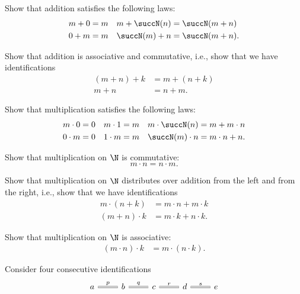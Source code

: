 \begin{exercises}
  \begin{subexenum}
  \item Show that addition satisfies the following laws:
    \begin{align*}
      m+0 & = m & m+\succN(n) & = \succN(m+n) \\
      0+m & = m & \succN(m)+n & = \succN(m+n).
    \end{align*}
  \item Show that addition is associative and commutative, i.e., show that we have identifications
    \begin{align*}
      (m+n)+k & = m+(n+k) \\
      m+n & = n+m.
    \end{align*}
  \item Show that multiplication satisfies the following laws:
    \begin{align*}
      m\cdot 0 & = 0 & m\cdot 1 & = m & m\cdot \succN(n) & = m+m\cdot n \\
      0\cdot m & = 0 & 1\cdot m & = m & \succN(m)\cdot n & = m\cdot n+n.
    \end{align*}
  \item Show that multiplication on $\N$ is commutative:
    \begin{equation*}
      m\cdot n=n\cdot m.
    \end{equation*}
  \item Show that multiplication on $\N$ distributes over addition from the left and from the right, i.e., show that we have identifications
    \begin{align*}
      m\cdot (n+k) & = m\cdot n + m\cdot k \\
      (m+n)\cdot k & = m\cdot k + n\cdot k.
    \end{align*}
  \item Show that multiplication on $\N$ is associative:
    \begin{align*}
      (m\cdot n)\cdot k & = m\cdot (n\cdot k).
    \end{align*}
  \end{subexenum}
\exercise Consider four consecutive identifications
  \begin{equation*}
    \begin{tikzcd}
      a \arrow[r,equals,"p"] & b \arrow[r,equals,"q"] & c \arrow[r,equals,"r"] & d \arrow[r,equals,"s"] & e
    \end{tikzcd}

\end{equation*}
\end{exercises}
